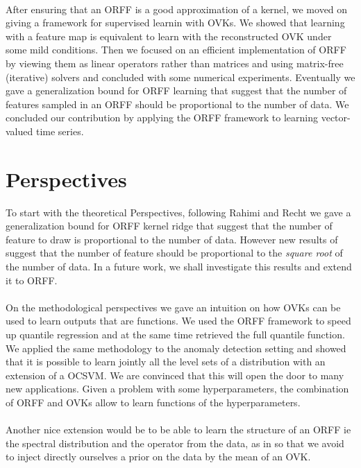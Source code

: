 \paragraph{}
After ensuring that an \acs{ORFF} is a good approximation of a kernel, we
moved on giving a framework for supervised learnin with \aclp{OVK}. We showed
that learning with a feature map is equivalent to learn with the reconstructed
\acs{OVK} under some mild conditions. Then we focused on an efficient
implementation of \acs{ORFF} by viewing them as linear operators rather than
matrices and using matrix-free (iterative) solvers and concluded with some
numerical experiments. Eventually we gave a generalization bound for \acs{ORFF}
learning that suggest that the number of features sampled in an \acs{ORFF}
should be proportional to the number of data. We concluded our contribution by
applying the \acs{ORFF} framework to learning vector-valued
time series.

\section{Perspectives}
To start with the theoretical Perspectives, following Rahimi and Recht we gave
a generalization bound for \acs{ORFF} kernel ridge that suggest that the number
of feature to draw is proportional to the number of data.  However new results
of \citet{rudi2016generalization} suggest that the number of feature should be
proportional to the \emph{square root} of the number of data. In a future work,
we shall investigate this results and extend it to \acs{ORFF}.
\paragraph{}
On the methodological perspectives we gave an intuition on how \aclp{OVK} can
be used to learn outputs that are functions. We used the \acs{ORFF} framework
to speed up quantile regression and at the same time retrieved the full
quantile function. We applied the same methodology to the anomaly detection
setting and showed that it is possible to learn jointly all the level sets of a
distribution with an extension of a \acl{OCSVM}. We are convinced that this
will open the door to many new applications. Given a problem with some
hyperparameters, the combination of \acs{ORFF} and \aclp{OVK} allow to learn
functions of the hyperparameters.
\paragraph{}
Another nice extension would be to be able to learn the structure of an
\acs{ORFF} \acs{ie} the spectral distribution and the operator from the data,
as in \citet{Yang2015} so that we avoid to inject directly ourselves a prior on
the data by the mean of an \acl{OVK}.
